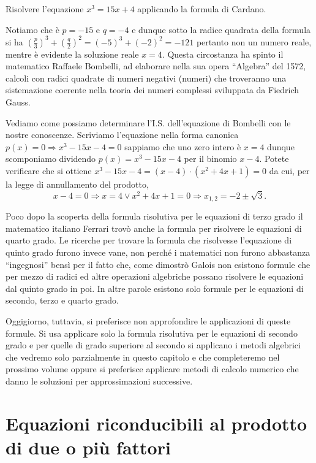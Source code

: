 \begin{esempio}
Risolvere l'equazione $x^3=15x+4$ applicando la formula di Cardano.

Notiamo che è $p=-15$ e $q=-4$ e dunque sotto la radice quadrata della formula 
si ha $\left(\frac p 3\right)^3+\left(\frac q 2\right)^2=(-5)^3+(-2)^2=-121$ 
pertanto non un numero
reale, mentre è evidente la soluzione reale $x=4$. Questa circostanza ha spinto 
il 
matematico Raffaele Bombelli, ad elaborare nella sua opera ``Algebra'' del 
1572, 
calcoli con radici 
quadrate di numeri negativi (numeri) che troveranno una sistemazione coerente 
nella teoria dei 
numeri complessi sviluppata da Fiedrich Gauss.

Vediamo come possiamo determinare l'I.S. dell'equazione di Bombelli con le 
nostre conoscenze. Scriviamo l'equazione nella forma canonica 
$p(x)=0\Rightarrow 
x^3-15x-4=0$ sappiamo che uno zero intero è $x=4$ dunque scomponiamo dividendo 
$p(x)=x^3-15x-4$ per il binomio $x-4$. Potete verificare che si ottiene 
$x^3-15x-4=(x-4)\cdot (x^2+4x+1)=0$ da cui, per la legge di annullamento del 
prodotto, 
\[x-4=0\Rightarrow x=4\vee x^2+4x+1=0\Rightarrow x_{1,2}=-2\pm \sqrt 3.\]

Poco dopo la scoperta della formula risolutiva per le equazioni di terzo grado 
il matematico italiano Ferrari trovò anche la formula per risolvere le 
equazioni di quarto grado. 
Le ricerche per trovare la formula che risolvesse l'equazione di quinto grado 
furono invece vane, non perché i matematici non furono abbastanza 
``ingegnosi'' bensì per il fatto che, come dimostrò Galois non esistono 
formule che per mezzo di radici ed altre operazioni algebriche possano 
risolvere le equazioni dal quinto grado in poi. In altre parole esistono 
solo formule per le equazioni di secondo, terzo e quarto grado.

Oggigiorno, tuttavia, si preferisce non approfondire le applicazioni di queste 
formule. Si usa applicare solo la formula risolutiva per le equazioni di 
secondo 
grado e per quelle di grado superiore al secondo si applicano i metodi 
algebrici che vedremo solo parzialmente in questo capitolo e che completeremo 
nel prossimo volume  oppure si preferisce applicare metodi di calcolo 
numerico che danno le soluzioni per approssimazioni successive.
\end{esempio}

\section{Equazioni riconducibili al prodotto di due o più fattori}
\label{sec:eq2gr_scomponibili}


